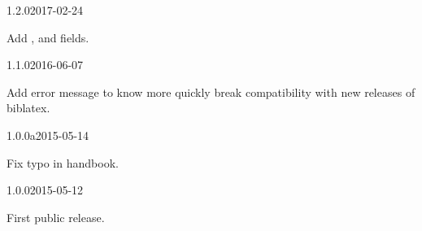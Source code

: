 \documentclass{ltxdockit}[2011/03/25]
\begin{document}
\begin{changelog}

\begin{release}{1.2.0}{2017-02-24}
  \item Add ,  and  fields.
\end{release}

\begin{release}{1.1.0}{2016-06-07}
  \item Add error message to know more quickly break compatibility with new releases of biblatex.
\end{release}

\begin{release}{1.0.0a}{2015-05-14}
\item Fix typo in handbook.
\end{release}

\begin{release}{1.0.0}{2015-05-12}
\item First public release.
\end{release}
\end{changelog}
\end{document}
